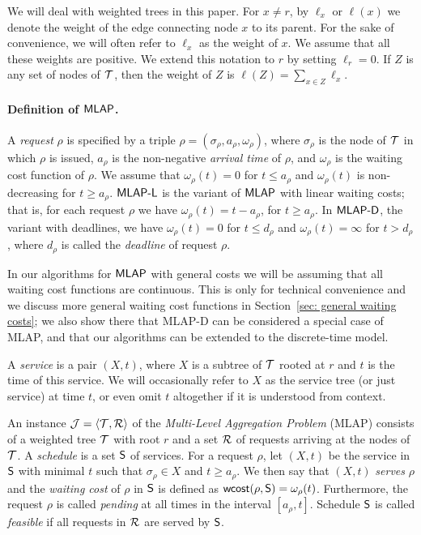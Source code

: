 \documentclass[a4paper]{article}
\newcommand{\calJ}{{\cal J}}
\newcommand{\calR}{{\cal R}}
\newcommand{\calT}{{\cal T}}
\newcommand{\angled}[1]{{ \left\langle #1 \right\rangle }}
\newcommand{\wcost}{\mbox{\rm\textsf{wcost}}}
\newcommand{\length}{\ell}
\newcommand{\MLAP}{\mbox{\rm\textsf{MLAP}}}
\newcommand{\MLAPL}{\mbox\rm{\textsf{MLAP-L}}}
\newcommand{\MLAPD}{\mbox{\rm\textsf{MLAP-D}}}
\newcommand{\schedS}{\mbox{\rm\textsf{S}}}
\newcommand{\trignode}{\sigma}
\begin{document}
We will deal with weighted trees in this paper. For $x\neq r$, by
$\length_x$ or $\length(x)$ we denote the weight of the edge
connecting node $x$ to its parent. For the sake of convenience,
we will often refer to $\length_x$ as the weight of $x$.
We assume that all these weights
are positive. We extend this notation to $r$ by setting $\length_r=0$.
If $Z$ is any set of nodes of $\calT$, then the weight of $Z$ is
$\length(Z) = \sum_{x\in Z}\length_x$.


\paragraph{Definition of $\MLAP$.}

A \emph{request} $\rho$ is specified by a triple $\rho =
(\trignode_\rho,a_\rho,\omega_\rho)$, where $\trignode_\rho$ is the
node of $\calT$ in which $\rho$ is issued, $a_\rho$ is the non-negative
\emph{arrival time} of $\rho$, and $\omega_\rho$ is the waiting cost
function of $\rho$. We assume that $\omega_\rho(t) = 0$ for $t\le
a_\rho$ and $\omega_\rho(t)$ is non-decreasing for $t\ge a_\rho$. 
$\MLAPL$ is the variant of $\MLAP$ with linear waiting costs; that is,
for each request $\rho$ we have
$\omega_\rho(t) = t-a_\rho$, for $t\ge a_\rho$.
In $\MLAPD$, the variant with deadlines,
we have $\omega_\rho(t) = 0$ for $t\le d_\rho$ and
$\omega_\rho(t) = \infty$ for $t > d_\rho$, where $d_\rho$ is called
the \emph{deadline} of request $\rho$.

In our algorithms for $\MLAP$ with general costs we will be assuming that 
all waiting cost functions are continuous.
This is only for technical convenience and we discuss more general waiting cost
functions in Section~\ref{sec: general waiting costs};
we also show there that {\MLAPD} can be considered a special case of {\MLAP},
and that our algorithms can be extended to the discrete-time model.

A \emph{service} is a pair $(X,t)$, where $X$ is a subtree of $\calT$
rooted at $r$ and $t$ is the time of this service. We will
occasionally refer to $X$ as the service tree (or just service) at
time $t$, or even omit $t$ altogether if it is understood from
context.

An instance $\calJ = \angled{\calT,\calR}$ of the \emph{Multi-Level
Aggregation Problem} ({\MLAP}) consists of a weighted tree $\calT$
with root $r$ and a set $\calR$ of requests arriving at the nodes of
$\calT$.  A \emph{schedule} is a set $\schedS$ of services. For a
request $\rho$, let $(X,t)$ be the service in $\schedS$ with minimal
$t$ such that $\trignode_\rho\in X$ and $t\geq a_\rho$.  We then say
that $(X,t)$ \emph{serves} $\rho$ and the \emph{waiting cost} of
$\rho$ in $\schedS$ is defined as
$\wcost(\rho,\schedS)=\omega_\rho(t)$. Furthermore, the request $\rho$
is called \emph{pending} at all times in the interval $[a_\rho,t]$.
Schedule $\schedS$ is called \emph{feasible} if all requests in
$\calR$ are served by $\schedS$.
\end{document}
